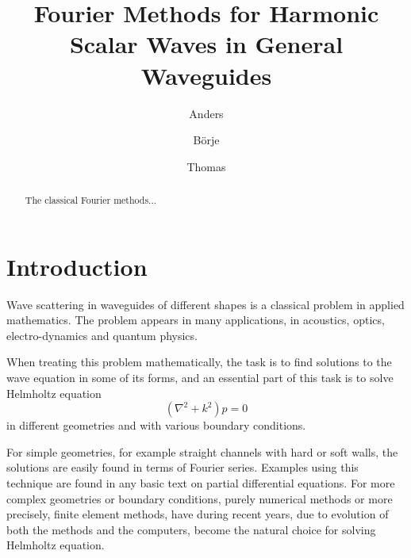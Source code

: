 \documentclass{kluwer}
\begin{document}
\begin{article}
  \begin{opening}
    \title{Fourier Methods for Harmonic Scalar Waves in General
      Waveguides}

    \author{Anders}
    \author{B\"orje}
    \author{Thomas}
    \begin{abstract}
      The classical Fourier methods...
    \end{abstract}
  \end{opening}

\section{Introduction}
\label{sec:intro}

Wave scattering in waveguides of different shapes is a classical
problem in applied mathematics. The problem appears in many
applications, in acoustics, optics, electro-dynamics and quantum
physics.

When treating this problem mathematically, the task is to find
solutions to the wave equation in some of its forms, and an essential
part of this task is to solve Helmholtz equation
\begin{equation}
  \label{eq:Helmholtz1}
  (\nabla^2+k^2)p=0
\end{equation}
in different geometries and with various boundary conditions.

For simple geometries, for example straight channels with hard or soft
walls, the solutions are easily found in terms of Fourier
series. Examples using this technique are found in any basic text on
partial differential equations. For more complex geometries or
boundary conditions, purely numerical methods or more precisely, finite
element methods, have during recent years, due to evolution of both
the methods and the computers, become the natural choice for solving
Helmholtz equation.



\end{article}
\end{document}
